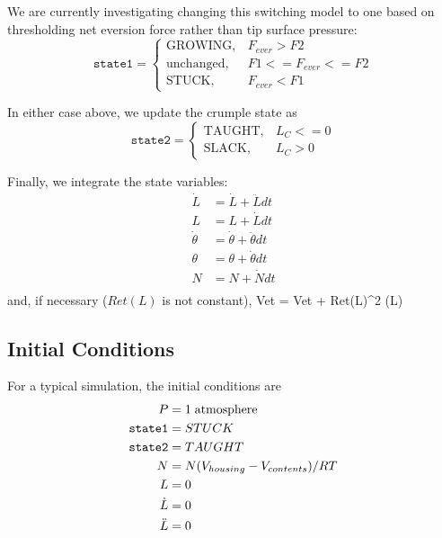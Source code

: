 \documentclass[letterpaper]{article}
\begin{document}
We are currently investigating changing this switching model to one based on thresholding
net eversion force rather than tip surface pressure:
\begin{equation}
    \mathtt{state1} =
    \begin{cases}
      \mathrm{GROWING},   &  F_{ever} > F2 \\
      \mathrm{unchanged}, &  F1 <= F_{ever} <= F2 \\
      \mathrm{STUCK},     &  F_{ever} < F1
    \end{cases}
\end{equation}

In either case above, we update the crumple state as
\begin{equation}
    \mathtt{state2} =
    \begin{cases}
      \mathrm{TAUGHT},  &  L_C <=0 \\
      \mathrm{SLACK},   &  L_C  > 0
    \end{cases}
\end{equation}

Finally, we integrate the state variables:
\begin{equation}
\begin{aligned}
  \dot{L} &= \dot{L} +  \ddot{L}  dt \\
  L       &= L + \dot{L}  dt \\
  \dot{\theta} &= \dot{\theta} + \ddot{\theta}dt \\
  \theta &= \theta + \dot{\theta} dt\\
  N &= N + \dot{N}  dt\\
\end{aligned}
\end{equation}
\noindent
and, if necessary ($Ret(L)$ is not constant),
\beq
Vet = Vet +  \pi Ret(L)^2  \; \dot(L)
\eeq

\subsection{Initial Conditions}
For a typical simulation, the initial conditions are
\begin{equation}
\begin{aligned}
  P &= 1 \; \mathrm{atmosphere}\\
  {\tt state1} &= STUCK \\
  {\tt state2} &= TAUGHT \\
  N &= N(V_{housing} - V_{contents}) / RT \\
  L &= 0\\
  \dot{L} &= 0\\
  \ddot{L} &= 0\\
\end{aligned}
\end{equation}
\end{document}
